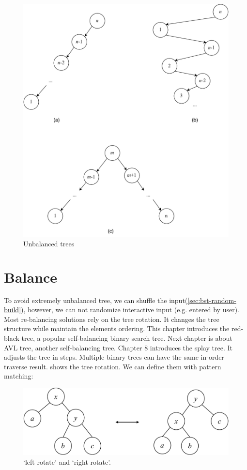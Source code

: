 \documentclass[b5paper]{article}
\begin{document}
\begin{figure}[htbp]
  \centering
  \includegraphics[scale=0.5]{img/unbalanced-trees}
  \caption{Unbalanced trees}
  \label{fig:unbalanced-trees}
\end{figure}

\section{Balance}

To avoid extremely unbalanced tree, we can shuffle the input(\cref{sec:bst-random-build}), however, we can not randomize interactive input (e.g. entered by user). Most re-balancing solutions rely on the tree rotation. It changes the tree structure while maintain the elements ordering. This chapter introduces the red-black tree, a popular self-balancing binary search tree. Next chapter is about AVL tree, another self-balancing tree. Chapter 8 introduces the splay tree. It adjusts the tree in steps. Multiple binary trees can have the same in-order traverse result.  shows the tree rotation. We can define them with pattern matching:

\begin{figure}[htbp]
   \centering
   \includegraphics[scale=0.4, page=1]{img/rbtree}
   \caption{`left rotate' and `right rotate'.}
   \label{fig:tree-rotation}
\end{figure}
\end{document}
